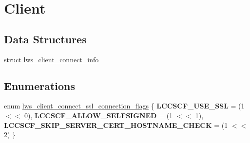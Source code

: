 \hypertarget{group__client}{}\section{Client}
\label{group__client}
\subsection*{Data Structures}
\begin{DoxyCompactItemize}
\item 
struct \hyperlink{structlws__client__connect__info}{lws\+\_\+client\+\_\+connect\+\_\+info}
\end{DoxyCompactItemize}
\subsection*{Enumerations}
\begin{DoxyCompactItemize}
\item 
enum \hyperlink{group__client_ga96f3dbad54b2853969cfa933d66871ce}{lws\+\_\+client\+\_\+connect\+\_\+ssl\+\_\+connection\+\_\+flags} \{ {\bfseries L\+C\+C\+S\+C\+F\+\_\+\+U\+S\+E\+\_\+\+S\+SL} = (1 $<$$<$ 0), 
{\bfseries L\+C\+C\+S\+C\+F\+\_\+\+A\+L\+L\+O\+W\+\_\+\+S\+E\+L\+F\+S\+I\+G\+N\+ED} = (1 $<$$<$ 1), 
{\bfseries L\+C\+C\+S\+C\+F\+\_\+\+S\+K\+I\+P\+\_\+\+S\+E\+R\+V\+E\+R\+\_\+\+C\+E\+R\+T\+\_\+\+H\+O\+S\+T\+N\+A\+M\+E\+\_\+\+C\+H\+E\+CK} = (1 $<$$<$ 2)
 \}
\end{DoxyCompactItemize}
